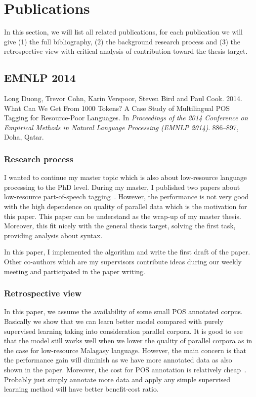 \documentclass[12pt,twoside,final,hidelinks]{ltthesis}
\theoremstyle{definition}
\begin{document}
\section{Publications}
\label{sec:publications}
In this section, we will list all related publications, for each publication we will give (1) the full bibliography, (2) the background research process and (3) the 
retrospective view with critical analysis of contribution toward the thesis target. 
\subsection{EMNLP 2014}
\label{sec:emnlp14}
Long Duong, Trevor Cohn, Karin Verspoor, Steven Bird and Paul Cook. 2014. What Can We Get From 1000 Tokens? A Case Study of Multilingual POS Tagging for Resource-Poor Languages. In \textit{Proceedings of the 2014 Conference on Empirical Methods in Natural Language Processing (EMNLP 2014)}. 886--897, Doha, Qatar.
\subsubsection{Research process}
I wanted to continue my master topic which is also about low-resource language processing to the PhD level. During my master, I published two papers about low-resource part-of-speech tagging~\cite{Duongacl13,duongIJCNLP}. However, the performance is not very good with the high dependence 
on quality of parallel data which is the motivation for this paper. This paper can be understand as the wrap-up of my master thesis. Moreover, 
this fit nicely with the general thesis target, solving the first task, providing analysis about syntax. 

In this paper, I implemented the algorithm and write the first draft of the paper. Other co-authors which are my supervisors contribute ideas during our weekly 
meeting and participated in the paper writing. 

\subsubsection{Retrospective view}
In this paper, we assume the availability of some small POS annotated corpus. Basically we show that we can learn better model compared with purely 
supervised learning taking into consideration parallel corpora. It is good to see that the model still works well when we lower the quality of parallel 
corpora as in the case for low-resource Malagasy language. However, the main concern is that the performance gain will diminish as we have more annotated 
data as also shown in the paper. Moreover, the cost for POS annotation is relatively cheap~\cite{garrette:naacl13}. Probably just simply annotate more data and 
apply any simple supervised learning method will have better benefit-cost ratio. 
\end{document}
